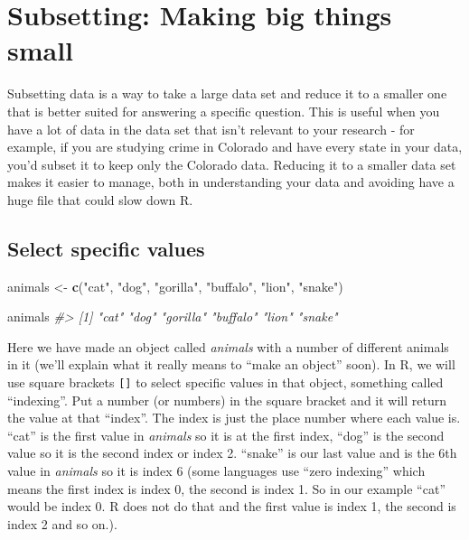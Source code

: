 \documentclass[
  12pt,
]{book}
\newenvironment{Shaded}{\begin{snugshade}}{\end{snugshade}}
\newcommand{\CommentTok}[1]{\textcolor[rgb]{0.37,0.37,0.37}{\textit{#1}}}
\newcommand{\KeywordTok}[1]{\textcolor[rgb]{0.27,0.27,0.27}{\textbf{#1}}}
\newcommand{\NormalTok}[1]{#1}
\newcommand{\StringTok}[1]{\textcolor[rgb]{0.5,0.5,0.5}{#1}}
\begin{document}
\hypertarget{subsetting-intro}{%
\chapter{Subsetting: Making big things small}\label{subsetting-intro}}

Subsetting data is a way to take a large data set and reduce it to a smaller one that is better suited for answering a specific question. This is useful when you have a lot of data in the data set that isn't relevant to your research - for example, if you are studying crime in Colorado and have every state in your data, you'd subset it to keep only the Colorado data. Reducing it to a smaller data set makes it easier to manage, both in understanding your data and avoiding have a huge file that could slow down R.

\hypertarget{select-specific-values}{%
\section{Select specific values}\label{select-specific-values}}

\begin{Shaded}
\begin{Highlighting}[]
\NormalTok{animals <{-}}\StringTok{ }\KeywordTok{c}\NormalTok{(}\StringTok{"cat"}\NormalTok{, }\StringTok{"dog"}\NormalTok{, }\StringTok{"gorilla"}\NormalTok{, }\StringTok{"buffalo"}\NormalTok{, }\StringTok{"lion"}\NormalTok{, }\StringTok{"snake"}\NormalTok{)}
\end{Highlighting}
\end{Shaded}

\begin{Shaded}
\begin{Highlighting}[]
\NormalTok{animals}
\CommentTok{\#> [1] "cat"     "dog"     "gorilla" "buffalo" "lion"    "snake"}
\end{Highlighting}
\end{Shaded}

Here we have made an object called \emph{animals} with a number of different animals in it (we'll explain what it really means to ``make an object'' soon). In R, we will use square brackets \texttt{{[}{]}} to select specific values in that object, something called ``indexing''. Put a number (or numbers) in the square bracket and it will return the value at that ``index''. The index is just the place number where each value is. ``cat'' is the first value in \emph{animals} so it is at the first index, ``dog'' is the second value so it is the second index or index 2. ``snake'' is our last value and is the 6th value in \emph{animals} so it is index 6 (some languages use ``zero indexing'' which means the first index is index 0, the second is index 1. So in our example ``cat'' would be index 0. R does not do that and the first value is index 1, the second is index 2 and so on.).
\end{document}
